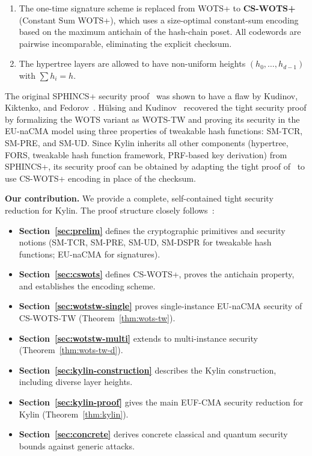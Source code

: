 \documentclass[11pt,a4paper]{article}
\begin{document}
\begin{enumerate}
    \item The one-time signature scheme is replaced from WOTS+ to \textbf{CS-WOTS+} (Constant Sum WOTS+), which uses a size-optimal constant-sum encoding based on the maximum antichain of the hash-chain poset. All codewords are pairwise incomparable, eliminating the explicit checksum.
    \item The hypertree layers are allowed to have non-uniform heights $(h_0,\ldots,h_{d-1})$ with $\sum h_i = h$.
\end{enumerate}

The original SPHINCS+ security proof~\cite{BHK+19} was shown to have a flaw by Kudinov, Kiktenko, and Fedorov~\cite{KKF20}. H\"ulsing and Kudinov~\cite{HK22} recovered the tight security proof by formalizing the WOTS variant as WOTS-TW and proving its security in the EU-naCMA model using three properties of tweakable hash functions: SM-TCR, SM-PRE, and SM-UD. Since Kylin inherits all other components (hypertree, FORS, tweakable hash function framework, PRF-based key derivation) from SPHINCS+, its security proof can be obtained by adapting the tight proof of~\cite{HK22} to use CS-WOTS+ encoding in place of the checksum.

\medskip
\textbf{Our contribution.} We provide a complete, self-contained tight security reduction for Kylin. The proof structure closely follows~\cite{HK22}:

\begin{itemize}
    \item \textbf{Section~\ref{sec:prelim}} defines the cryptographic primitives and security notions (SM-TCR, SM-PRE, SM-UD, SM-DSPR for tweakable hash functions; EU-naCMA for signatures).
    \item \textbf{Section~\ref{sec:cswots}} defines CS-WOTS+, proves the antichain property, and establishes the encoding scheme.
    \item \textbf{Section~\ref{sec:wotstw-single}} proves single-instance EU-naCMA security of CS-WOTS-TW (Theorem~\ref{thm:wots-tw}).
    \item \textbf{Section~\ref{sec:wotstw-multi}} extends to multi-instance security (Theorem~\ref{thm:wots-tw-d}).
    \item \textbf{Section~\ref{sec:kylin-construction}} describes the Kylin construction, including diverse layer heights.
    \item \textbf{Section~\ref{sec:kylin-proof}} gives the main EUF-CMA security reduction for Kylin (Theorem~\ref{thm:kylin}).
    \item \textbf{Section~\ref{sec:concrete}} derives concrete classical and quantum security bounds against generic attacks.
\end{itemize}
\end{document}
